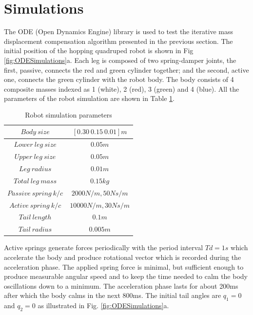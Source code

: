 \section{Simulations}\label{sec:simulation}

The ODE (Open Dynamics Engine) library \cite{ode:2008} is used to test the iterative mass displacement compensation algorithm presented in the previous section. The initial position of the hopping quadruped robot is shown in Fig \ref{fig:ODESimulations}a. Each leg is composed of two spring-damper joints, the first, passive, connects the red and green cylinder together; and the second, active one, connects the green cylinder with the robot body. The body consists of 4 composite masses indexed as 1 (white), 2 (red), 3 (green) and 4 (blue). All the parameters of the  robot simulation are shown in Table \ref{tab:RobotDimensions}.

\begin{table}[!t]
\centering
\begin{tabular}{|c|c|}
	\hline
	$Body\: size$ &  $[0.30\: 0.15\: 0.01]m$ \\
	\hline
	$Lower\:leg\:size$ &  $0.05m$ \\
	\hline
	$Upper\:leg\:size$ &  $0.05m$ \\
	\hline
	$Leg\:radius$ &  $0.01m$ \\
	\hline
	$Total\:leg\:mass$ &  $0.15kg$ \\
	\hline
	$Passive\:spring\:k/c$ &  $2000N/m, 50Ns/m$ \\
	\hline
	$Active\:spring\:k/c$ &  $10000N/m, 30Ns/m$ \\
	\hline
	$Tail\:length$ &  $0.1m$ \\
	\hline
	$Tail\:radius$ &  $0.005m$ \\
	\hline
\end{tabular}
\caption{Robot simulation parameters}\label{tab:RobotDimensions}
\end{table}



Active springs generate forces periodically with the period interval $Td=1s$ which accelerate the body and produce rotational vector which is recorded during the acceleration phase. The applied spring force is minimal, but sufficient enough to produce measurable angular speed and to keep the time needed to calm the body oscillations down to a minimum. The acceleration phase lasts for about 200ms after which the body calms in the next 800ms. The initial tail angles are $q_1=0$ and $q_2=0$ as illustrated in Fig. \ref{fig:ODESimulations}a.

